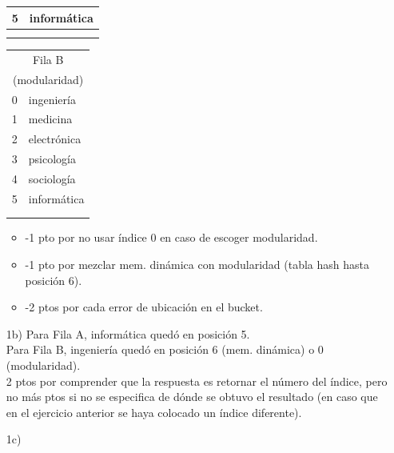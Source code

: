 \documentclass[letter,12pt,oneside]{book}
\theoremstyle{definition}
\begin{document}
\begin{enumerate}
\begin{tabular}{|c|l|}
        5 & informática\\\hline
    \multicolumn{2}{c}{}\\
    \multicolumn{2}{c}{}\\
    \end{tabular}
    \hspace{2ex}
    \begin{tabular}{|c|l|}
    \multicolumn{2}{c}{Fila B}\\
    \multicolumn{2}{c}{(modularidad)}\\\hline
        0 & ingeniería \\\hline
        1 & medicina   \\\hline
        2 & electrónica\\\hline
        3 & psicología \\\hline
        4 & sociología \\\hline
        5 & informática\\\hline
    \multicolumn{2}{c}{}\\
    \multicolumn{2}{c}{}\\
    \end{tabular}

    \begin{itemize}
        \item -1 pto por no usar índice 0 en caso de escoger modularidad.
        \item -1 pto por mezclar mem. dinámica con modularidad (tabla hash hasta posición 6).
        \item -2 ptos por cada error de ubicación en el bucket.
    \end{itemize}
    \item[1b)] Para Fila A, informática quedó en posición 5.\\
    Para Fila B, ingeniería quedó en posición 6 (mem. dinámica) o 0 (modularidad).\\
    2 ptos por comprender que la respuesta es retornar el número del índice, pero no más ptos si no se especifica de dónde se obtuvo el resultado (en caso que en el ejercicio anterior se haya colocado un índice diferente).
    \item[1c)] $~$
    

\end{enumerate}
\end{document}
